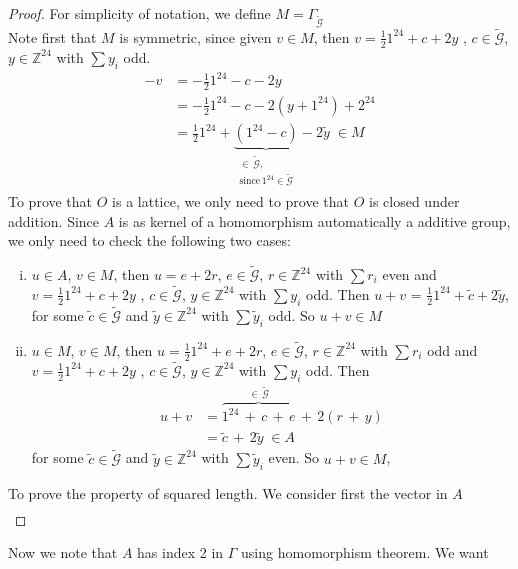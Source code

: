 \documentclass{article}
\numberwithin{equation}{theorem}
\numberwithin{figure}{theorem}
\newcommand{\cCodes}{\ensuremath{\widetilde{\mathscr{G}}}}
\newcommand{\buildLattice}[1]{\ensuremath{\Gamma_{#1}}}
\newcommand{\wt}[1]{\ensuremath{\text{wt}(#1)}}
\newcommand{\Integer}{\ensuremath{\mathbb{Z}}}
\begin{document}
\begin{proof}
For simplicity of notation, we define $M = \buildLattice{\cCodes}$\\
Note first that $M$ is symmetric, since given $v \in M$, then $v = \frac{1}{2}1^{24} + c + 2y$ , $c \in \cCodes$, $y \in \Integer^{24}$ with $\sum{y_i}$ odd. 
\begin{align*}	
 -v &= -\frac{1}{2}1^{24} - c - 2y\\
 	&= -\frac{1}{2}1^{24} - c - 2(y + 1^{24}) + 2^{24}\\
 	&= \frac{1}{2}1^{24} + \underbrace{(1^{24} - c)}_{\substack{\in \,\cCodes, \\ \text{since} \, 1^{24} \in \cCodes}} - 2\tilde{y} \;\in M 
\end{align*}
To prove that $O$ is a lattice,  we only need to prove that $O$ is closed under addition. Since $A$ is as kernel of a homomorphism automatically a additive group, we only need to check the following two cases:
\begin{enumerate}[i)]
	\item $u \in A$, $v \in M$, then $u = e + 2r$, $e \in \cCodes$, $r \in \Integer^{24}$ with $\sum r_i $ even and $v = \frac{1}{2}1^{24} + c + 2y$ , $c \in \cCodes$, $y \in \Integer^{24}$ with $\sum{y_i}$ odd. Then $u + v$ = $\frac{1}{2}1^{24} + \tilde{c} + 2\tilde{y}$, for some $\tilde{c} \in \cCodes$ and $\tilde{y} \in \Integer^{24}$ with $\sum{\tilde{y}_i}$ odd. So $u + v \in M$
	\item $u \in M$, $v \in M$, then $u = \frac{1}{2}1^{24}+ e + 2r$, $e \in \cCodes$, $r \in \Integer^{24}$ with $\sum r_i $ odd and $v = \frac{1}{2}1^{24} + c + 2y$ , $c \in \cCodes$, $y \in \Integer^{24}$ with $\sum{y_i}$ odd. Then 
	\begin{align*}
	u + v &= \overbrace{1^{24}\, +\, c \,+ \,e}^{\in \,\cCodes}\, +\, 2(r\, + \,y)\\
		 &= \tilde{c}\, + \,2\tilde{y} \; \in A
	\end{align*}
	for some $\tilde{c} \in \cCodes$ and $\tilde{y} \in \Integer^{24}$ with $\sum{\tilde{y}_i}$ even. So $u + v \in M$, 
\end{enumerate}
To prove the property of squared length. We consider first the vector in $A$
\begin{align*}

\end{align*}
\end{proof}
Now we note that $A$ has index 2 in $\Gamma$ using homomorphism theorem. We want 
\end{document}
